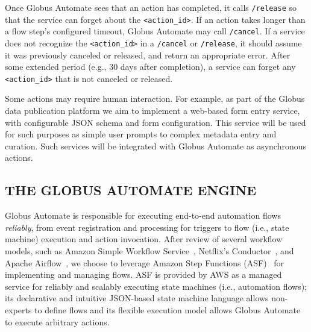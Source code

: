 \documentclass{aip-cp}
\newcommand\code[1]{{\tt \footnotesize #1}}
\newcommand\darkcode[1]{\code{#1}}
\begin{document}
Once Globus Automate sees that an action has completed, it calls \darkcode{/release} 
so that the service can forget about the \code{<action\_id>}.  
If an action takes longer than a flow step's configured timeout,
Globus Automate may call \darkcode{/cancel}. 
If a service does not recognize the \darkcode{<action\_id>} in a \darkcode{/cancel} or 
\darkcode{/release}, 
it should assume it was previously canceled or released, and return an appropriate error. 
After some extended period (e.g., 30 days after completion),
a service can forget any \code{<action\_id>} that is not canceled or released. 

Some actions may require human interaction.  For example, as part of 
the Globus data publication platform we aim to implement 
a web-based form entry service, 
with configurable JSON schema and form configuration. 
This service will be used for such purposes 
as simple user prompts to complex metadata entry and curation.
Such services will be integrated with Globus Automate as asynchronous actions.

\subsection{THE GLOBUS AUTOMATE ENGINE}
Globus Automate is responsible for executing end-to-end automation flows \emph{reliably}, 
from event registration and processing for triggers to
flow (i.e., state machine) execution and action invocation. 
After review of several workflow models, such as Amazon Simple
Workflow Service~\cite{AmazonSWF}, Netflix's Conductor~\cite{conductor}, and Apache 
Airflow~\cite{airflow}, 
we choose to leverage
Amazon Step Functions (ASF)~\cite{AmazonSteps} for implementing and managing flows.
ASF is provided by AWS as a managed service for reliably 
and scalably executing state machines (i.e., automation flows);
its declarative and intuitive JSON-based state machine language allows non-experts
to define
flows and its flexible execution model allows Globus Automate
to execute arbitrary actions.
\end{document}
